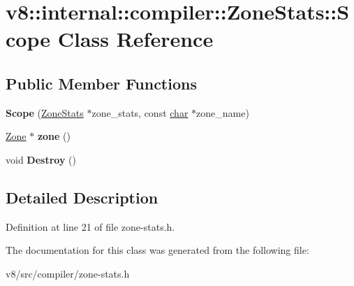 \hypertarget{classv8_1_1internal_1_1compiler_1_1ZoneStats_1_1Scope}{}\section{v8\+:\+:internal\+:\+:compiler\+:\+:Zone\+Stats\+:\+:Scope Class Reference}
\label{classv8_1_1internal_1_1compiler_1_1ZoneStats_1_1Scope}
\subsection*{Public Member Functions}
\begin{DoxyCompactItemize}
\item 
\mbox{\label{classv8_1_1internal_1_1compiler_1_1ZoneStats_1_1Scope_af8763423b72cdf4e600ec5de1c23e442}} 
{\bfseries Scope} (\mbox{\hyperlink{classv8_1_1internal_1_1compiler_1_1ZoneStats}{Zone\+Stats}} $\ast$zone\+\_\+stats, const \mbox{\hyperlink{classchar}{char}} $\ast$zone\+\_\+name)
\item 
\mbox{\label{classv8_1_1internal_1_1compiler_1_1ZoneStats_1_1Scope_ad97380b946b23410e4648e1a5c8dbb6b}} 
\mbox{\hyperlink{classv8_1_1internal_1_1Zone}{Zone}} $\ast$ {\bfseries zone} ()
\item 
\mbox{\label{classv8_1_1internal_1_1compiler_1_1ZoneStats_1_1Scope_af8479a2cd66e39b1bd6ef5021a1be9b2}} 
void {\bfseries Destroy} ()
\end{DoxyCompactItemize}


\subsection{Detailed Description}


Definition at line 21 of file zone-\/stats.\+h.



The documentation for this class was generated from the following file\+:\begin{DoxyCompactItemize}
\item 
v8/src/compiler/zone-\/stats.\+h\end{DoxyCompactItemize}
